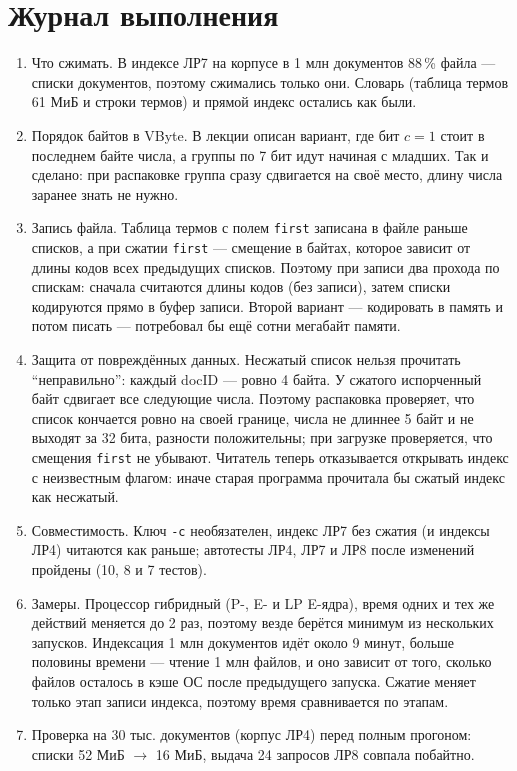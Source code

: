 \section{Журнал выполнения}
\begin{enumerate}
    \item Что сжимать. В индексе ЛР7 на корпусе в 1 млн документов 88\,\% файла --- списки документов, поэтому сжимались только они. Словарь (таблица термов 61 МиБ и строки термов) и прямой индекс остались как были.
    \item Порядок байтов в VByte. В лекции описан вариант, где бит $c = 1$ стоит в последнем байте числа, а группы по 7 бит идут начиная с младших. Так и сделано: при распаковке группа сразу сдвигается на своё место, длину числа заранее знать не нужно.
    \item Запись файла. Таблица термов с полем \texttt{first} записана в файле раньше списков, а при сжатии \texttt{first} --- смещение в байтах, которое зависит от длины кодов всех предыдущих списков. Поэтому при записи два прохода по спискам: сначала считаются длины кодов (без записи), затем списки кодируются прямо в буфер записи. Второй вариант --- кодировать в память и потом писать --- потребовал бы ещё сотни мегабайт памяти.
    \item Защита от повреждённых данных. Несжатый список нельзя прочитать \enquote{неправильно}: каждый docID --- ровно 4 байта. У сжатого испорченный байт сдвигает все следующие числа. Поэтому распаковка проверяет, что список кончается ровно на своей границе, числа не длиннее 5 байт и не выходят за 32 бита, разности положительны; при загрузке проверяется, что смещения \texttt{first} не убывают. Читатель теперь отказывается открывать индекс с неизвестным флагом: иначе старая программа прочитала бы сжатый индекс как несжатый.
    \item Совместимость. Ключ \texttt{-c} необязателен, индекс ЛР7 без сжатия (и индексы ЛР4) читаются как раньше; автотесты ЛР4, ЛР7 и ЛР8 после изменений пройдены (10, 8 и 7 тестов).
    \item Замеры. Процессор гибридный (P-, E- и LP E-ядра), время одних и тех же действий меняется до 2 раз, поэтому везде берётся минимум из нескольких запусков. Индексация 1 млн документов идёт около 9 минут, больше половины времени --- чтение 1 млн файлов, и оно зависит от того, сколько файлов осталось в кэше ОС после предыдущего запуска. Сжатие меняет только этап записи индекса, поэтому время сравнивается по этапам.
    \item Проверка на 30 тыс. документов (корпус ЛР4) перед полным прогоном: списки 52 МиБ $\to$ 16 МиБ, выдача 24 запросов ЛР8 совпала побайтно.
\end{enumerate}

